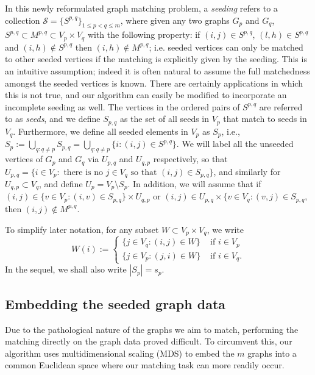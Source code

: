 \documentclass[12pt]{article}
\numberwithin{equation}{section}
\theoremstyle{definition}
\begin{document}
In this newly reformulated graph matching problem, a {\it seeding} refers to a collection $\mathcal{S}=\{S^{p,q}\}_{1 \leq p < q \leq m}$, where given any two graphs $G_p$ and $G_q$, $S^{p,q}\subset M^{p,q}\subset V_p\times V_q$ with the following property: if $(i,j)\in S^{p,q}$, $(l,h)\in S^{p,q}$ and $(i,h)\notin S^{p,q}$ then $(i,h)\notin M^{p,q}$; i.e. seeded vertices can only be matched to other seeded vertices if the matching is explicitly given by the seeding.
This is an intuitive assumption; indeed it is often natural to assume the full matchedness amongst the seeded vertices is known.  There are certainly applications in which this is not true, and our algorithm can easily be modified to incorporate an incomplete seeding as well.
The vertices in the ordered pairs of $S^{p,q}$ are referred to as {\it seeds}, and we define $S_{p,q}$ as the set of all seeds in $V_p$ that match to seeds in $V_q$.
Furthermore, we define all seeded elements in $V_p$ as $S_{p}$, i.e., $S_{p} := \bigcup\limits_{q: q \ne p} S_{p,q} = \bigcup\limits_{q: q \ne p} \{i : (i, j) \in S^{p,q} \}$.
We will label all the unseeded vertices of $G_p$ and $G_q$ via $U_{p,q}$
and $U_{q,p}$ respectively, so that
$U_{p,q} = \{i \in V_p : \text{ there is no } j \in V_q \text{ so that } 
    (i,j) \in S_{p,q}\}$, and 
similarly for $U_{q,p}\subset V_q$, and define $U_p = V_p \setminus S_p$. 
In addition, we will assume that if 
$(i,j) \in \{v \in V_p : (i,v) \in S_{p,q}\} \times U_{q,p}$ or 
$(i,j) \in U_{p,q} \times \{v \in V_q : (v,j) \in S_{p,q}$, then 
$(i,j)\notin M^{p,q}$.


  To simplify later notation, for any subset  $W\subset V_p\times V_q$, we write
$$W(i):=\begin{cases}
\{j\in V_q:(i,j)\in W\}&\text{ if }i\in V_p\\
\{j\in V_p:(j,i)\in W\}&\text{ if }i\in V_q.
\end{cases}$$
In the sequel, we shall also write $|S_{p}|=s_{p}$.


\subsection{Embedding the seeded graph data}
\label{S:embed}
Due to the pathological nature of the graphs we aim to match, performing the matching directly on the graph data proved difficult.
To circumvent this, our algorithm uses multidimensional scaling (MDS) to embed the $m$ graphs into a common Euclidean space where our matching task can more readily occur.
\end{document}
